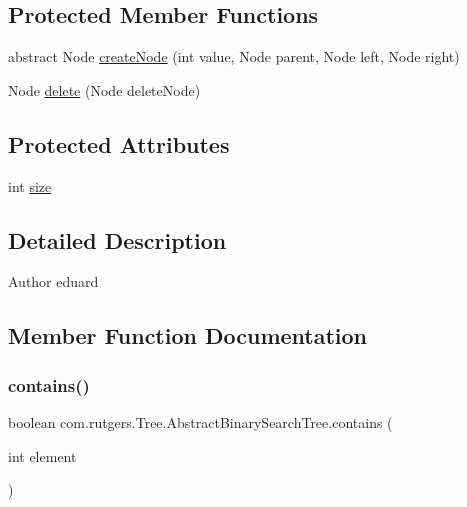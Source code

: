 \subsection*{Protected Member Functions}
\begin{DoxyCompactItemize}
\item 
abstract Node \hyperlink{classcom_1_1rutgers_1_1Tree_1_1AbstractBinarySearchTree_a4413dcd9175fd180bf7bd75aa0b94b73}{create\+Node} (int value, Node parent, Node left, Node right)
\item 
Node \hyperlink{classcom_1_1rutgers_1_1Tree_1_1AbstractBinarySearchTree_ab0b52e6fb9cdac67ef88ac7be48a3b60}{delete} (Node delete\+Node)
\end{DoxyCompactItemize}
\subsection*{Protected Attributes}
\begin{DoxyCompactItemize}
\item 
int \hyperlink{classcom_1_1rutgers_1_1Tree_1_1AbstractBinarySearchTree_aea91d533d1a9c4fa552c1625c50dd65d}{size}
\end{DoxyCompactItemize}


\subsection{Detailed Description}
\begin{DoxyAuthor}{Author}
eduard 
\end{DoxyAuthor}


\subsection{Member Function Documentation}
\mbox{\label{classcom_1_1rutgers_1_1Tree_1_1AbstractBinarySearchTree_a3fa83547331d30e71ef6906cfc67d686}} 
\subsubsection{\texorpdfstring{contains()}{contains()}}
{\footnotesize\ttfamily boolean com.\+rutgers.\+Tree.\+Abstract\+Binary\+Search\+Tree.\+contains (\begin{DoxyParamCaption}\item[{int}]{element }\end{DoxyParamCaption})}


